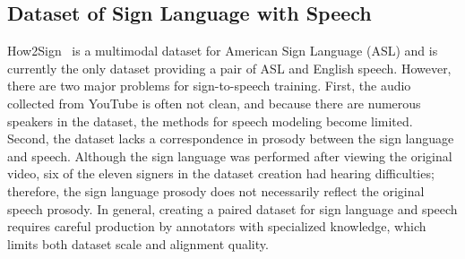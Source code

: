 \subsection{Dataset of Sign Language with Speech}
\label{sec:paired_dataset}
How2Sign~\cite{Duarte_2021_CVPR} is a multimodal dataset for American Sign Language (ASL) and is currently the only dataset providing a pair of ASL and English speech.
However, there are two major problems for sign-to-speech training.
First, the audio collected from YouTube is often not clean, 
and because there are numerous speakers in the dataset, 
the methods for speech modeling become limited.
Second, the dataset lacks a correspondence in prosody between the sign language and speech. 
Although the sign language was performed after viewing the original video,
six of the eleven signers in the dataset creation had hearing difficulties;
therefore, the sign language prosody does not necessarily reflect the original speech prosody.
In general, creating a paired dataset for sign language and speech requires 
careful production by annotators with specialized knowledge,
which limits both dataset scale and alignment quality.

